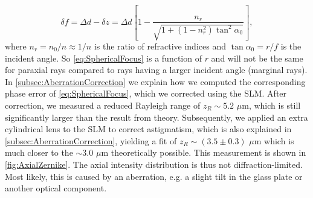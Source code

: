 \begin{equation}\label{eq:SphericalFocus}
    \delta f = \Delta d - \delta z = \Delta d \left[
    1 - \frac{n_r}{\sqrt{1+(1-n_r^2)\tan^2{\alpha_0}}}
    \right],
\end{equation}
where $n_r=n_0/n\approx1/n$ is the ratio of refractive indices and $\tan{\alpha_0} = r/f$ is the incident angle. 
So \cref{eq:SphericalFocus} is a function of $r$ and will not be the same for paraxial rays compared to rays having a larger incident angle (marginal rays). 
In \cref{subsec:AberrationCorrection} we explain how we computed the corresponding phase error of \cref{eq:SphericalFocus}, which we corrected using the \ac{SLM}.
After correction, we measured a reduced Rayleigh range of $z_R \sim 5.2$ $\mu$m, which is still significantly larger than the result from theory. 
Subsequently, we applied an extra cylindrical lens to the SLM to correct astigmatism, which is also explained in \cref{subsec:AberrationCorrection}, yielding a fit of $z_R \sim (3.5 \pm 0.3)$ $\mu$m which is much closer to the $\sim 3.0$ $\mu$m theoretically possible.
This measurement is shown in \cref{fig:AxialZernike}.
The axial intensity distribution is thus not diffraction-limited. 
Most likely, this is caused by an aberration, e.g. a slight tilt in the glass plate or another optical component.




















